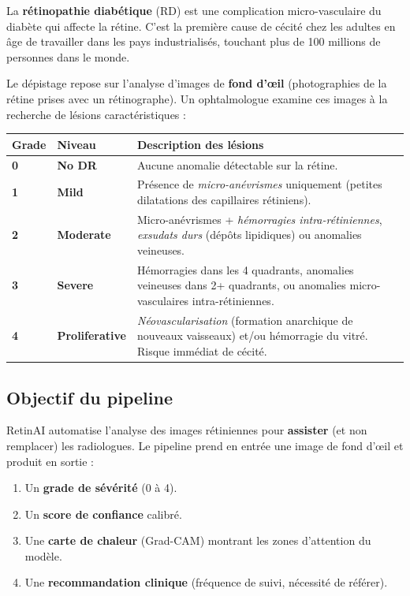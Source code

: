 ﻿\documentclass[11pt,a4paper]{article}
\begin{document}
La \textbf{rétinopathie diabétique} (RD) est une complication micro-vasculaire du diabète qui affecte la rétine. C'est la première cause de cécité chez les adultes en âge de travailler dans les pays industrialisés, touchant plus de 100 millions de personnes dans le monde.

Le dépistage repose sur l'analyse d'images de \textbf{fond d'œil} (photographies de la rétine prises avec un rétinographe). Un ophtalmologue examine ces images à la recherche de lésions caractéristiques :

\begin{center}
\renewcommand{\arraystretch}{1.4}
\begin{tabularx}{\textwidth}{>{\bfseries}l>{\bfseries}lX}
\toprule
Grade & Niveau & Description des lésions \\
\midrule
\cellcolor{mygreen!10} 0 & No DR & Aucune anomalie détectable sur la rétine. \\
\cellcolor{myblue!10} 1 & Mild & Présence de \textit{micro-anévrismes} uniquement (petites dilatations des capillaires rétiniens). \\
\cellcolor{myorange!10} 2 & Moderate & Micro-anévrismes + \textit{hémorragies intra-rétiniennes}, \textit{exsudats durs} (dépôts lipidiques) ou anomalies veineuses. \\
\cellcolor{myred!10} 3 & Severe & Hémorragies dans les 4 quadrants, anomalies veineuses dans 2+ quadrants, ou anomalies micro-vasculaires intra-rétiniennes. \\
\cellcolor{myred!30} 4 & Proliferative & \textit{Néovascularisation} (formation anarchique de nouveaux vaisseaux) et/ou hémorragie du vitré. Risque immédiat de cécité. \\
\bottomrule
\end{tabularx}
\end{center}

\subsection{Objectif du pipeline}

RetinAI automatise l'analyse des images rétiniennes pour \textbf{assister} (et non remplacer) les radiologues. Le pipeline prend en entrée une image de fond d'œil et produit en sortie :

\begin{enumerate}[leftmargin=2em]
  \item Un \textbf{grade de sévérité} (0 à 4).
  \item Un \textbf{score de confiance} calibré.
  \item Une \textbf{carte de chaleur} (Grad-CAM) montrant les zones d'attention du modèle.
  \item Une \textbf{recommandation clinique} (fréquence de suivi, nécessité de référer).
\end{enumerate}
\end{document}
